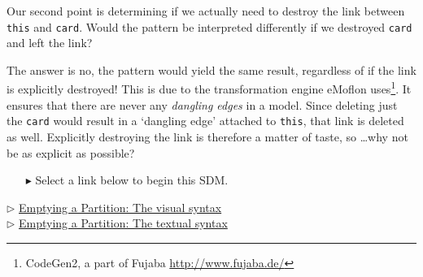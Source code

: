 Our second point is determining if we actually need to destroy the link between \texttt{this} and \texttt{card}. Would the pattern be interpreted differently if we
destroyed \texttt{card} and left the link?

The answer is no, the pattern would yield the same result, regardless of if the link is explicitly destroyed!  This is due to the
transformation engine eMoflon uses\footnote{CodeGen2, a part of Fujaba \url{http://www.fujaba.de/}}. It ensures that there are never any \emph{dangling edges}
in a model. Since deleting just the \texttt{card} would result in a `dangling edge' attached to \texttt{this}, that link is deleted as well. Explicitly
destroying the link is therefore a matter of taste, so \ldots why not be as explicit as possible?

\vspace{1cm}
\begin{itemize}
\item[$\blacktriangleright$] Select a link below to begin this SDM.
\end{itemize}

\begin{center} {$\triangleright$ \hyperlink{emptyPartition vis}{Emptying a Partition: The visual syntax}}%
\\ \vspace{0.5cm}
{$\triangleright$ \hyperlink{emptyPartition tex}{Emptying a Partition: The textual syntax} }\end{center} 





